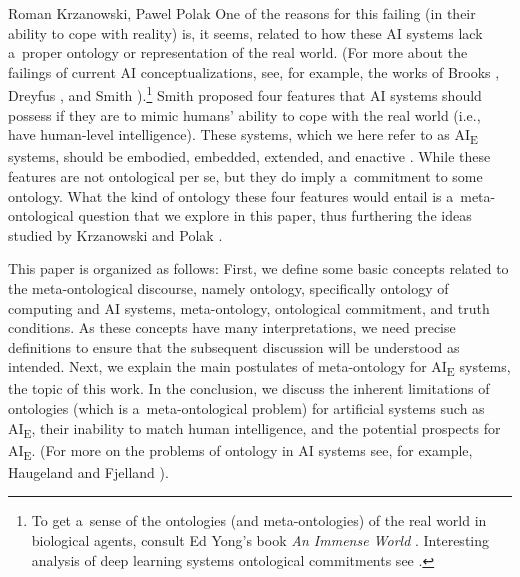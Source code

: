 \begin{artengenv2auth}{Roman Krzanowski, Pawel Polak}
One of the reasons for this failing (in their ability to cope with reality) is, it seems, related to how these AI systems lack a~proper ontology or representation of the real world. (For more about the failings of current AI conceptualizations, see, for example, the works of Brooks
\parencite*[][]{brooks_intelligence_1991}, %
 Dreyfus 
\parencite*[][]{dreyfus_skillful_2016}, %
 and Smith 
\parencite*[][]{smith_promise_2019}%
).\footnote{To get a~sense of the ontologies (and meta-ontologies) of the real world in biological agents, consult Ed Yong's book \textit{An Immense World} 
\parencite[][]{yong_immense_2022}. %
Interesting analysis of deep learning systems ontological commitments see
\parencite[][]{sekrst_machine_2022}.} %
Smith 
\parencite*[][p.44]{smith_promise_2019} %
 proposed four features that AI systems should possess if they are to mimic humans' ability to cope with the real world (i.e., have human-level intelligence). These systems, which we here refer to as AI\textsubscript{E} systems, should be embodied, embedded, extended, and enactive 
\parencite[see also][]{kaufer_phenomenology_2021}. %
 While these features are not ontological per se, but they do imply a~commitment to some ontology. What the kind of ontology these four features would entail is a~meta-ontological question that we explore in this paper, thus furthering the ideas studied by Krzanowski and Polak 
\parencite*[][]{krzanowski_ontology_2022}.%


This paper is organized as follows: First, we define some basic concepts related to the meta-ontological discourse, namely ontology, specifically ontology of computing and AI systems, meta-ontology, ontological commitment, and truth conditions. As these concepts have many interpretations, we need precise definitions to ensure that the subsequent discussion will be understood as intended. Next, we explain the main postulates of meta-ontology for AI\textsubscript{E} systems, the topic of this work. In the conclusion, we discuss the inherent limitations of ontologies (which is a~meta-ontological problem) for artificial systems such as AI\textsubscript{E}, their inability to match human intelligence, and the potential prospects for AI\textsubscript{E}. (For more on the problems of ontology in AI systems see, for example, Haugeland
\parencite*[][]{haugeland_artificial_1985} %
 and Fjelland 
\parencite*[][]{fjelland_why_2020}%
).


\end{artengenv2auth}
